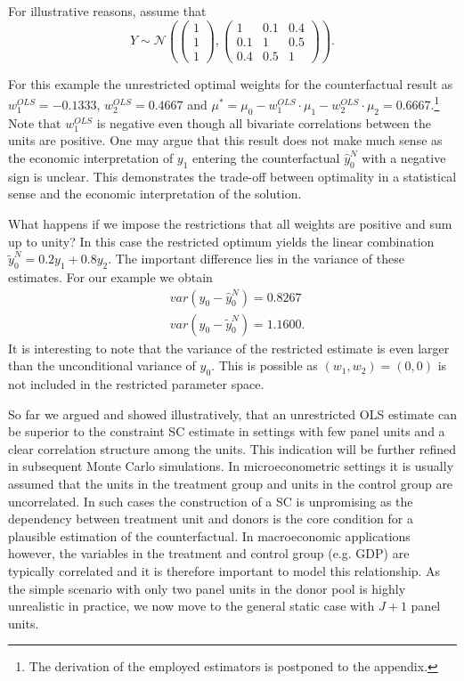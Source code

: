 For illustrative reasons, assume that 
\[
Y \sim \mathcal{N}\left( 
\begin{pmatrix} 1\\ 1\\ 1 \end{pmatrix}, 
\begin{pmatrix} 1 &0.1 &0.4\\0.1 &1 &0.5\\0.4 &0.5 &1 \end{pmatrix}\right). 
\] 

For this example the unrestricted optimal weights for the counterfactual result as $w_1^{OLS} = -0.1333$, $w_2^{OLS} = 0.4667$ and $\mu^* = \mu_0 - w_1^{OLS} \cdot \mu_1 - w_2^{OLS} \cdot \mu_2 = 0.6667$.\footnote{The derivation of the employed estimators is postponed to the appendix.} Note that $w_1^{OLS}$ is negative even though all bivariate correlations between the units are positive. One may argue that this result does not make much sense as the economic interpretation of $y_1$ entering the counterfactual $\widehat{y}^{N}_{0}$ with a negative sign is unclear. This demonstrates the trade-off between optimality in a statistical sense and the economic interpretation of the solution.  

What happens if we impose the restrictions that all weights are positive and sum up to unity? In this case the restricted optimum yields the linear combination $\widetilde{y}^{N}_{0} = 0.2 y_1 + 0.8 y_2$.
The important difference lies in the variance of these estimates. For our example we obtain
\begin{equation*}
	\begin{split}
		& var(y_0 - \widehat{y}^{N}_{0}) = 0.8267 \\
		& var(y_0 - \widetilde{y}^{N}_{0}) = 1.1600.
	\end{split}
\end{equation*}
It is interesting to note that the variance of the restricted estimate is even larger than the unconditional variance of $y_0$. This is possible as $(w_1, w_2) = (0,0)$ is not included in the restricted parameter space. 

So far we argued and showed illustratively, that an unrestricted \ac{OLS} estimate can be superior to the constraint \ac{SC} estimate in settings with few panel units and a clear correlation structure among the units. This indication will be further refined in subsequent Monte Carlo simulations. In microeconometric settings it is usually assumed that the units in the treatment group and units in the control group are uncorrelated. In such cases the construction of a \ac{SC} is unpromising as the dependency between treatment unit and donors is the core condition for a plausible estimation of the counterfactual. In macroeconomic applications however, the variables in the treatment and control group (e.g. \ac{GDP}) are typically correlated and it is therefore important to model this relationship. As the simple scenario with only two panel units in the donor pool is highly unrealistic in practice, we now move to the general static case with $J+1$ panel units.
